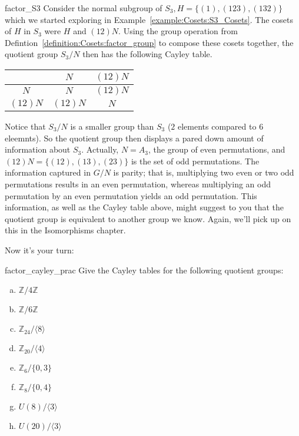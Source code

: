  
\begin{example}{factor_S3}
Consider the normal subgroup of $S_3, H = \{ (1), (123), (132)  \}$ which we started exploring in Example~\ref{example:Cosets:S3_Cosets}.
The cosets of $H$ in $S_3$ were $H$ and $(12) N$. Using the group operation from Defintion~\ref{definition:Cosets:factor_group} to compose these cosets together, the quotient group $S_3
/ N$ then has the following Cayley table.
\begin{center}
\begin{tabular}{c|cc}
         & $N$      & $(12) N$ \\
\hline
$N$      & $N$      & $(12) N$ \\
$(12) N$ & $(12) N$ & $N$
\end{tabular}
\end{center}

Notice that  $S_3 / N$ is a smaller group than $S_3$ ($2$ elements compared to $6$ eleemnts). So the quotient group then displays a pared down amount of
information about $S_3$.  Actually, $N = A_3$, the group of even
permutations, and $(12) N = \{ (12), (13), (23) \}$ is the set of odd
permutations. The information captured in $G/N$ is parity; that is,
multiplying two even or two odd permutations results in an even
permutation, whereas multiplying an odd permutation by an even
permutation yields an odd permutation.  This information, as well as the Cayley table above, might suggest to you that the quotient group is equivalent to another group we know.  Again, we'll pick up on this in the Isomorphisms chapter. 
\end{example}
 
 


Now it's your turn:

\begin{exercise}{factor_cayley_prac}
Give the Cayley tables for the following quotient groups:

\begin{multicols}{2}
\begin{enumerate}[(a)]
\item
 ${\mathbb Z}/ 4 {\mathbb Z}$

\item
 ${\mathbb Z}/ 6 {\mathbb Z}$
\item
 ${\mathbb Z}_{24} / \langle 8 \rangle$ 

\item
 ${\mathbb Z}_{20} / \langle 4 \rangle$ 

\item
${\mathbb Z}_{6} / \{0,3\}$

\item
${\mathbb Z}_{8} / \{0,4\}$
\item
$U(8) / \langle 3 \rangle$
\item
$U(20) / \langle 3 \rangle$

\end{enumerate}
\end{multicols}
\end{exercise}
 
